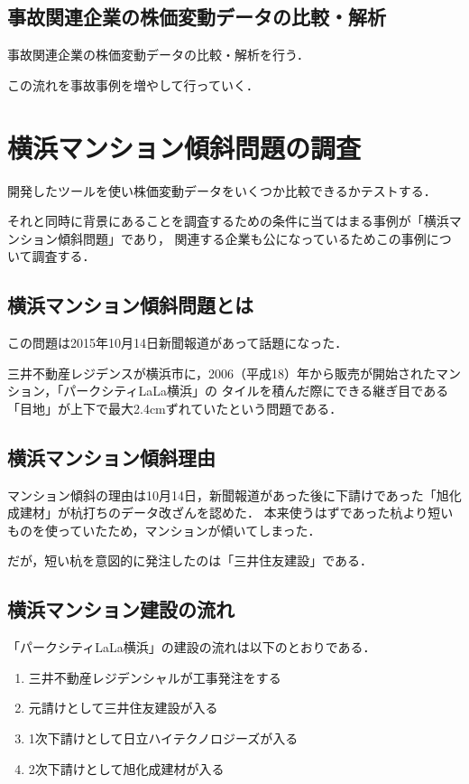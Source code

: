 {\subsection{事故関連企業の株価変動データの比較・解析}
事故関連企業の株価変動データの比較・解析を行う．

この流れを事故事例を増やして行っていく．










\section{横浜マンション傾斜問題の調査}
開発したツールを使い株価変動データをいくつか比較できるかテストする．

それと同時に背景にあることを調査するための条件に当てはまる事例が「横浜マンション傾斜問題」であり，
関連する企業も公になっているためこの事例について調査する．



\subsection{横浜マンション傾斜問題とは}
この問題は2015年10月14日新聞報道があって話題になった．

三井不動産レジデンスが横浜市に，2006（平成18）年から販売が開始されたマンション，「パークシティLaLa横浜」の
タイルを積んだ際にできる継ぎ目である「目地」が上下で最大2.4cmずれていたという問題である．



\subsection{横浜マンション傾斜理由}
マンション傾斜の理由は10月14日，新聞報道があった後に下請けであった「旭化成建材」が杭打ちのデータ改ざんを認めた．
本来使うはずであった杭より短いものを使っていたため，マンションが傾いてしまった．

だが，短い杭を意図的に発注したのは「三井住友建設」である．
\subsection{横浜マンション建設の流れ}
「パークシティLaLa横浜」の建設の流れは以下のとおりである．

\begin{enumerate}
  \item 三井不動産レジデンシャルが工事発注をする
  \item 元請けとして三井住友建設が入る
  \item 1次下請けとして日立ハイテクノロジーズが入る
  \item 2次下請けとして旭化成建材が入る
\end{enumerate}

}

